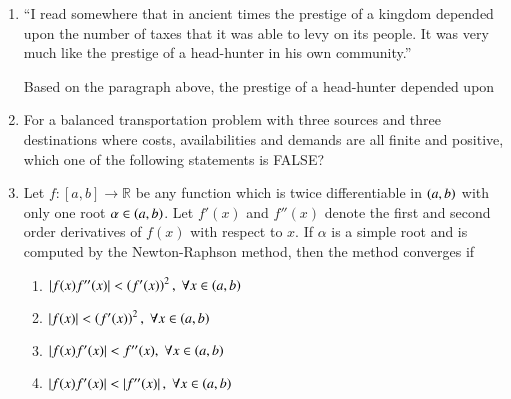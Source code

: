 \documentclass[journal,12pt,onecolumn]{IEEEtran}
\theoremstyle{remark}
\begin{document}
\begin{enumerate}[start=1, label=Q.\arabic*]
\hfill{}


\item “I read somewhere that in ancient times the prestige of a kingdom depended upon the number of taxes that it was able to levy on its people. It was very much like the prestige of a head-hunter in his own community.”  

Based on the paragraph above, the prestige of a head-hunter depended upon  
\begin{enumerate}
\end{enumerate}

\hfill{}


\item For a balanced transportation problem with three sources and three destinations where costs, availabilities and demands are all finite and positive, which one of the following statements is FALSE?  
\begin{enumerate}
\end{enumerate}

\hfill{}


\item Let $f : [a,b] \to \mathbb{R}$ be any function which is twice differentiable in $\left(a,b\right)$ with only one root $\alpha \in \left(a,b\right)$. Let $f'(x)$ and $f''(x)$ denote the first and second order derivatives of $f(x)$ with respect to $x$. If $\alpha$ is a simple root and is computed by the Newton-Raphson method, then the method converges if  
\begin{enumerate}
\item $\left\vert f(x) f''(x)\right\vert < \left(f'(x)\right)^2, \; \forall x \in \left(a,b\right)$  
\item $\left\vert f(x)\right\vert < \left(f'(x)\right)^2, \; \forall x \in \left(a,b\right)$  
\item $\left\vert f(x) f'(x)\right\vert < f''(x), \; \forall x \in \left(a,b\right)$  
\item $\left\vert f(x) f'(x)\right\vert < \left\vert f''(x)\right\vert, \; \forall x \in \left(a,b\right)$  
\end{enumerate}


\end{enumerate}
\end{document}
